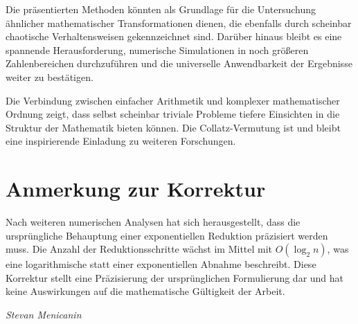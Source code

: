 \documentclass[a4paper,12pt]{article}
\begin{document}
Die präsentierten Methoden könnten als Grundlage für die Untersuchung ähnlicher mathematischer Transformationen dienen, die ebenfalls durch scheinbar chaotische Verhaltensweisen gekennzeichnet sind. Darüber hinaus bleibt es eine spannende Herausforderung, numerische Simulationen in noch größeren Zahlenbereichen durchzuführen und die universelle Anwendbarkeit der Ergebnisse weiter zu bestätigen.

Die Verbindung zwischen einfacher Arithmetik und komplexer mathematischer Ordnung zeigt, dass selbst scheinbar triviale Probleme tiefere Einsichten in die Struktur der Mathematik bieten können. Die Collatz-Vermutung ist und bleibt eine inspirierende Einladung zu weiteren Forschungen.

\section*{Anmerkung zur Korrektur}  

Nach weiteren numerischen Analysen hat sich herausgestellt, dass die ursprüngliche Behauptung einer exponentiellen Reduktion präzisiert werden muss. Die Anzahl der Reduktionsschritte wächst im Mittel mit \( O(\log_2 n) \), was eine logarithmische statt einer exponentiellen Abnahme beschreibt. Diese Korrektur stellt eine Präzisierung der ursprünglichen Formulierung dar und hat keine Auswirkungen auf die mathematische Gültigkeit der Arbeit.


\vspace{1cm}
\begin{flushright}
\textit{Stevan Menicanin}
\end{flushright}
\end{document}
